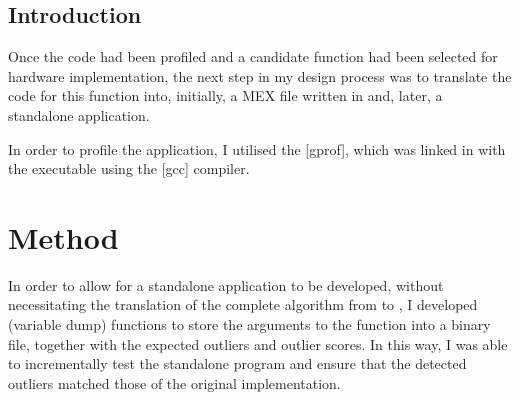 \subsection{Introduction}
\label{profiling:c:introduction}
Once the  code had been profiled and a candidate function had
been selected for hardware implementation, the next step in my design process
was to translate the  code for this function into, initially, a
 MEX file written in  and, later, a standalone
 application.

In order to profile the  application, I utilised the
[gprof], which was linked in with the executable using
the [gcc]  compiler.

\section{Method}
\label{profiling:c:method}
In order to allow for a standalone  application to be developed,
without necessitating the translation of the complete  algorithm from  to , I
developed  (variable dump) functions to store the arguments to
the  function into a binary file, together
with the expected outliers and outlier scores. In this way, I was able to
incrementally test the standalone  program and ensure that the
detected outliers matched those of the original 
implementation.

